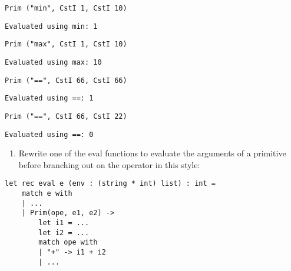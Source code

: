 \documentclass[11pt]{article}
\providecommand{\tightlist}{%
      \setlength{\itemsep}{0pt}\setlength{\parskip}{0pt}}
\begin{document}
    \begin{Verbatim}[commandchars=\\\{\}]
Prim ("min", CstI 1, CstI 10)
    \end{Verbatim}

    
    \begin{Verbatim}[commandchars=\\\{\}]
Evaluated using min: 1
    \end{Verbatim}

    
    \begin{Verbatim}[commandchars=\\\{\}]
Prim ("max", CstI 1, CstI 10)
    \end{Verbatim}

    
    \begin{Verbatim}[commandchars=\\\{\}]
Evaluated using max: 10
    \end{Verbatim}

    
    \begin{Verbatim}[commandchars=\\\{\}]
Prim ("==", CstI 66, CstI 66)
    \end{Verbatim}

    
    \begin{Verbatim}[commandchars=\\\{\}]
Evaluated using ==: 1
    \end{Verbatim}

    
    \begin{Verbatim}[commandchars=\\\{\}]
Prim ("==", CstI 66, CstI 22)
    \end{Verbatim}

    
    \begin{Verbatim}[commandchars=\\\{\}]
Evaluated using ==: 0
    \end{Verbatim}

    
    \begin{enumerate}
\def\labelenumi{(\roman{enumi})}
\setcounter{enumi}{2}
\tightlist
\item
  Rewrite one of the eval functions to evaluate the arguments of a
  primitive before branching out on the operator in this style:
\end{enumerate}

\begin{verbatim}
let rec eval e (env : (string * int) list) : int =
    match e with
    | ...
    | Prim(ope, e1, e2) ->
        let i1 = ...
        let i2 = ...
        match ope with
        | "+" -> i1 + i2
        | ...
\end{verbatim}
\end{document}
